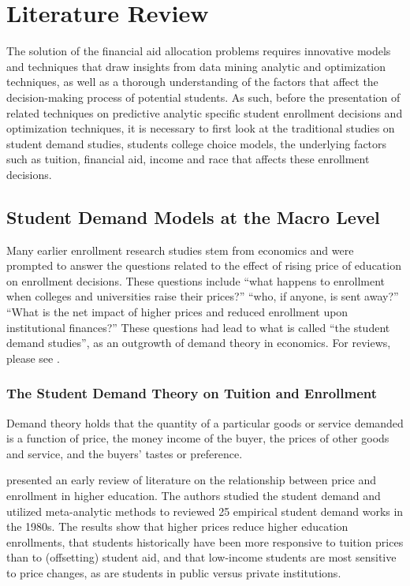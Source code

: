 \documentclass[12pt,english]{report}
\begin{document}
\chapter{Literature Review}
The solution of the financial aid allocation problems requires innovative
models and techniques that draw insights from data mining analytic and
optimization techniques, as well as a thorough understanding of the factors
that affect the decision-making process of potential students.  As such,
before the presentation of related techniques on predictive analytic 
specific student enrollment decisions and  optimization techniques, it
is necessary to first look at the traditional studies on student
demand studies, students college choice models, the underlying factors 
such as tuition, financial aid, income and race that affects these
enrollment decisions.

\section{Student Demand Models at the Macro Level }
Many earlier enrollment research studies stem from economics and were prompted
to answer the questions related to the effect of rising price of education on
enrollment decisions. These questions include  ``what happens to enrollment
when colleges and universities raise their prices?''  ``who, if anyone, is sent
away?''  ``What is the net impact of higher prices and reduced enrollment upon
institutional finances?''  These questions had lead to what is called ``the
student demand studies'', as an outgrowth of demand theory in economics.   For
reviews, please see \citep{Leslie1987,  Leslie1988, Heller1997, Ehrenberg2004,
Crouse2015}.

\subsection{The Student Demand Theory on Tuition and Enrollment}
Demand theory holds that the quantity of a particular goods or service demanded
is a function of price, the money income of the buyer, the prices of other
goods and service, and the buyers' tastes or preference.

\citet{Leslie1987} presented an early review of literature on the relationship
between price and enrollment in higher education. The authors studied the
student demand and utilized meta-analytic methods to reviewed 25 empirical
student demand works in the 1980s. The results show that higher prices reduce
higher education enrollments, that students historically have been more
responsive to tuition prices than to (offsetting) student aid, and that
low-income students are most sensitive to price changes, as are students in
public versus private institutions.
\end{document}
